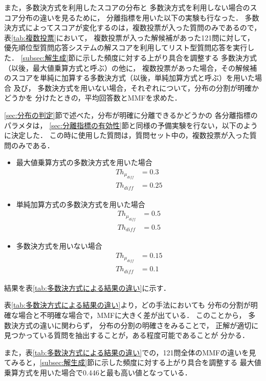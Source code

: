 \documentclass[japanese]{jnlp_1.4}
\begin{document}
また，多数決方式を利用したスコアの分布と
多数決方式を利用しない場合のスコア分布の違いを見るために，
分離指標を用いた以下の実験も行なった．
多数決方式によってスコアが変化するのは，複数投票が入った質問のみであるので，
表\ref{tab:複数投票}において，
複数投票が入った解候補があった121問に対して，
優先順位型質問応答システムの解スコアを利用してリスト型質問応答を実行した．
\ref{subsec:解生成}節に示した頻度に対する上がり具合を調整する
多数決方式（以後，最大値乗算方式と呼ぶ）の他に，
複数投票があった場合，その解候補のスコアを単純に加算する多数決方式（以後，単純加算方式と呼ぶ）を用いた場合
及び，
多数決方式を用いない場合，それぞれについて，分布の分割が明確かどうかを
分けたときの，平均回答数とMMFを求めた．

\ref{sec:分布の判定}節で述べた，分布が明確に分離できるかどうかの
各分離指標のパラメタは，
\ref{sec:分離指標の有効性}節と同様の予備実験を行ない，以下のように決定した．
この時に使用した質問は，質問セット中の，複数投票が入った質問のみである．

\begin{itemize}
\item 最大値乗算方式の多数決方式を用いた場合
\begin{align}
Th_{\mu_{\mathit{diff}}} & = 0.3 \\
Th_{\mathit{diff}} & = 0.25
\end{align}
\item 単純加算方式の多数決方式を用いた場合
\begin{align}
Th_{\mu_{\mathit{diff}}} & = 0.5 \\
Th_{\mathit{diff}} & = 0.5
\end{align}
\item 多数決方式を用いない場合
\vspace{-0.5\baselineskip}
\begin{align}
Th_{\mu_{\mathit{diff}}} & = 0.15 \\
Th_{\mathit{diff}} & = 0.1
\end{align}
\end{itemize}

結果を表\ref{tab:多数決方式による結果の違い}に示す．

表\ref{tab:多数決方式による結果の違い}より，どの手法においても
分布の分割が明確な場合と不明確な場合で，MMFに大きく差が出ている．
このことから，
多数決方式の違いに関わらず，
分布の分割の明確さをみることで，
正解が適切に見つかっている質問を抽出することが，ある程度可能であることが
分かる．

また，表\ref{tab:多数決方式による結果の違い}での，121問全体のMMFの違いを見てみると，\ref{subsec:解生成}節に示した頻度に対する上がり具合を調整する
最大値乗算方式を用いた場合で0.446と最も高い値となっている．
\end{document}
